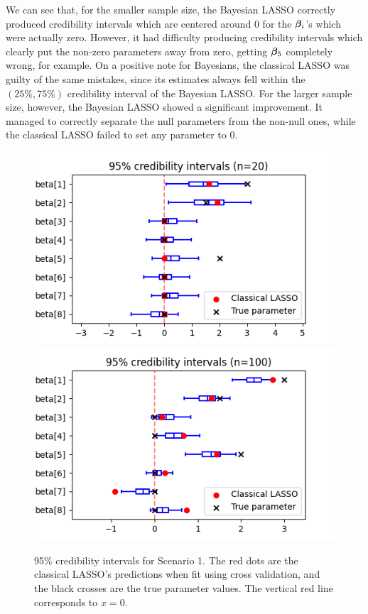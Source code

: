 \documentclass[a4paper, 10pt]{article}
\begin{document}
We can see that, for the smaller sample size, the Bayesian LASSO correctly produced credibility intervals which are centered around $ 0 $ for the $ \boldsymbol{\beta}_{ i } $'s which were actually zero.
However, it had difficulty producing credibility intervals which clearly put the non-zero parameters away from zero, getting $ \boldsymbol{\beta}_{ 5 } $ completely wrong, for example.
On a positive note for Bayesians, the classical LASSO was guilty of the same mistakes, since its estimates always fell within the $ (25\%, 75\%) $ credibility interval of the Bayesian LASSO.
For the larger sample size, however, the Bayesian LASSO showed a significant improvement.
It managed to correctly separate the null parameters from the non-null ones, while the classical LASSO failed to set any parameter to $ 0 $.
\begin{figure}[htb]
    \begin{center}
        \includegraphics[width=.6\textwidth]{../outputs/artificial_scenarios_n=20/scenario_1/credibility_intervals.png}
        \vspace{1cm}
        \includegraphics[width=.6\textwidth]{../outputs/artificial_scenarios_n=100/scenario_1/credibility_intervals.png}
    \end{center}
    \caption[95\% credibility intervals for Scenario 1.]{95\% credibility intervals for Scenario 1. The red dots are the classical LASSO's predictions when fit using cross validation, and the black crosses are the true parameter values. The vertical red line corresponds to $ x = 0 $.}
    \label{fig: credibility intervals scenario 1}
\end{figure}
\end{document}
